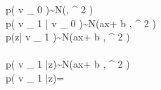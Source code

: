 p({ v }_{ 0 })\quad \sim \quad N(\mu ,{ \sigma  }^{ 2 })\\ p({ v }_{ 1 }|{ v }_{ 0 })\quad \sim \quad N(ax+{ b },{ \sigma  }^{ 2 })\\ p(z|{ v }_{ 1 })\quad \sim \quad N(ax+{ b },{ \sigma  }^{ 2 })\\ \\ p({ v }_{ 1 }|z)\quad \sim \quad N(ax+{ b },{ \sigma  }^{ 2 })\\ p({ v }_{ 1 }|z)\quad =\quad {} \\ \\ \\ \\ 